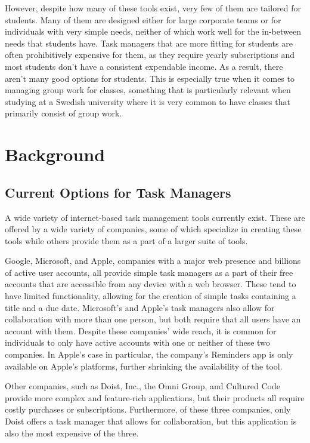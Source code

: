\documentclass[11pt,oneside]{article}
\begin{document}
However, despite how many of these tools exist, very few of them are tailored for students. Many of them are designed either for large corporate teams or for individuals with very simple needs, neither of which work well for the in-between needs that students have. Task managers that are more fitting for students are often prohibitively expensive for them, as they require yearly subscriptions and most students don’t have a consistent expendable income. As a result, there aren’t many good options for students. This is especially true when it comes to managing group work for classes, something that is particularly relevant when studying at a Swedish university where it is very common to have classes that primarily consist of group work.

\section{Background}
\label{cha:background}
\subsection{Current Options for Task Managers}
A wide variety of internet-based task management tools currently exist. These are offered by a wide variety of companies, some of which specialize in creating these tools while others provide them as a part of a larger suite of tools.

Google, Microsoft, and Apple, companies with a major web presence and billions of active user accounts, all provide simple task managers as a part of their free accounts that are accessible from any device with a web browser. These tend to have limited functionality, allowing for the creation of simple tasks containing a title and a due date. Microsoft’s and Apple’s task managers also allow for collaboration with more than one person, but both require that all users have an account with them. Despite these companies’ wide reach, it is common for individuals to only have active accounts with one or neither of these two companies. In Apple’s case in particular, the company’s Reminders app is only available on Apple’s platforms, further shrinking the availability of the tool.


Other companies, such as Doist, Inc., the Omni Group, and Cultured Code provide more complex and feature-rich applications, but their products all require costly purchases or subscriptions. Furthermore, of these three companies, only Doist offers a task manager that allows for collaboration, but this application is also the most expensive of the three.
\end{document}
